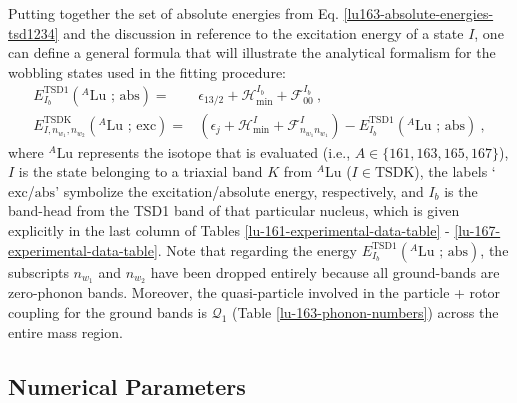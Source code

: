 Putting together the set of absolute energies from Eq. \ref{lu163-absolute-energies-tsd1234} and the discussion in reference to the excitation energy of a state $I$, one can define a general formula that will illustrate the analytical formalism for the wobbling states used in the fitting procedure:
\begin{align}
    E_{I_b}^\text{TSD1}(^A\text{Lu\ ;\ abs})=&\epsilon_{13/2}+\mathcal{H}_\text{min}^{I_b}+\mathcal{F}_{00}^{I_b}\ ,\nonumber\\
    E_{I,n_{w_1},n_{w_2}}^\text{TSDK}(^A\text{Lu\ ;\ exc})=&\left(\epsilon_{j}+\mathcal{H}_\text{min}^I+\mathcal{F}^I_{n_{w_1}n_{w_1}}\right)-E_{I_b}^\text{TSD1}(^A\text{Lu\ ;\ abs})\ ,
    \label{general-excitation-energy-fitting-model}
\end{align}
where $^A$Lu represents the isotope that is evaluated (i.e., $A\in\{161,163,165,167\}$), $I$ is the state belonging to a triaxial band $K$ from $^A$Lu ($I\in\text{TSDK}$), the labels `$\text{exc}$/$\text{abs}$' symbolize the excitation/absolute energy, respectively, and $I_b$ is the band-head from the TSD1 band of that particular nucleus, which is given explicitly in the last column of Tables \ref{lu-161-experimental-data-table} - \ref{lu-167-experimental-data-table}. Note that regarding the energy $E_{I_b}^\text{TSD1}(^A\text{Lu\ ;\ abs})$, the subscripts $n_{w_1}$ and $n_{w_2}$ have been dropped entirely because all ground-bands are zero-phonon bands. Moreover, the quasi-particle involved in the particle + rotor coupling for the ground bands is $\mathcal{Q}_1$ (Table \ref{lu-163-phonon-numbers}) across the entire mass region.

\subsection{Numerical Parameters}

